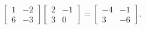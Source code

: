 \begin{enumerate}[label=\Alph*)]
\begin{answer}
$$\begin{bmatrix}
                    1 & -2 \\
                    6 & -3
                \end{bmatrix}\begin{bmatrix}
                    2 & -1 \\
                    3 & 0
                \end{bmatrix} = \begin{bmatrix}
                    -4 & -1 \\
                    3 & -6
                \end{bmatrix}.$$
            \end{answer}
        \end{enumerate}

